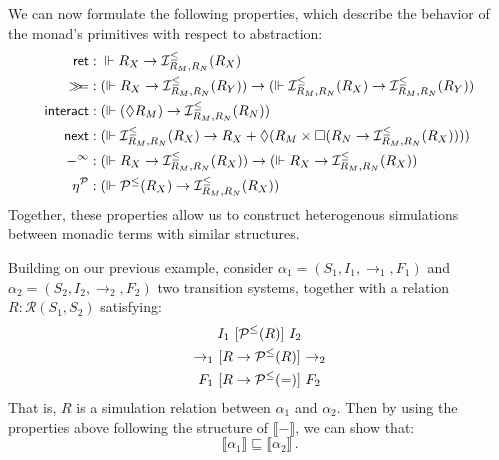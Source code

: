 We can now formulate the following properties,
which describe the behavior of the monad's primitives
with respect to abstraction:
\begin{align*}
   \mathsf{ret}  &:
    {}\Vdash R_X \rightarrow \mathcal{I}^\le_{R_M,R_N}(R_X) \\
  \gg\!\!= &:
    (\Vdash R_X \rightarrow
     \mathcal{I}^\le_{R_M,R_N}(R_Y)) \rightarrow
    (\Vdash \mathcal{I}^\le_{R_M,R_N}(R_X) \rightarrow
     \mathcal{I}^\le_{R_M,R_N}(R_Y)) \\
   \mathsf{interact}  &:
    (\Vdash (\Diamond R_M) \rightarrow
     \mathcal{I}^\le_{R_M,R_N}(R_N)) \\
   \mathsf{next}  &:
    (\Vdash \mathcal{I}^\le_{R_M,R_N}(R_X) \rightarrow
     R_X +
     \Diamond (R_M \times
     \Box (R_N \rightarrow \mathcal{I}^\le_{R_M,R_N}(R_X)))) \\
  -^\infty &:
    (\Vdash R_X \rightarrow \mathcal{I}^\le_{R_M,R_N}(R_X)) \rightarrow
    (\Vdash R_X \rightarrow \mathcal{I}^\le_{R_M,R_N}(R_X)) \\
  \eta^\mathcal{P} &:
    (\Vdash \mathcal{P}^\le(R_X) \rightarrow
     \mathcal{I}^\le_{R_M,R_N}(R_X))
\end{align*}
Together,
these properties allow us to construct
heterogenous simulations
between monadic terms with similar structures.

\begin{example} \label{ex:sim}
Building on our previous example,
consider
$\alpha_1 = (S_1, I_1, {\rightarrow}_1, F_1)$ and
$\alpha_2 = (S_2, I_2, {\rightarrow}_2, F_2)$
two transition systems,
together with a relation
$R : \mathcal{R}(S_1, S_2)$
satisfying:
\begin{gather*}
  I_1 \ [{\mathcal{P}^\le(R)}]\  I_2 \\
  {\rightarrow}_1 \ [{R \rightarrow \mathcal{P}^\le(R)}]\  {\rightarrow}_2 \\
  F_1 \ [{R \rightarrow \mathcal{P}^\le(=)}]\  F_2
\end{gather*}
That is, $R$ is a simulation relation between $\alpha_1$ and $\alpha_2$.
Then by using the properties above
following the structure of $\llbracket - \rrbracket$,
we can show that:
\[
    \llbracket \alpha_1 \rrbracket \sqsubseteq
    \llbracket \alpha_2 \rrbracket \,.
\]
\end{example}



